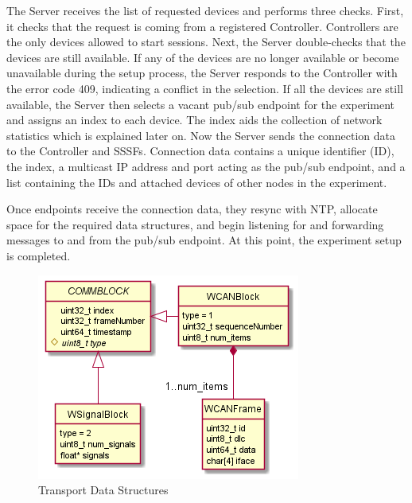 \documentclass[letterpaper,twocolumn,12pt]{article}
\begin{document}
The Server receives the list of requested devices and performs three checks. First, it checks that the request is coming from a registered Controller. Controllers are the only devices allowed to start sessions. Next, the Server double-checks that the devices are still available. If any of the devices are no longer available or become unavailable during the setup process, the Server responds to the Controller with the error code 409, indicating a conflict in the selection. If all the devices are still available, the Server then selects a vacant pub/sub endpoint for the experiment and assigns an index to each device. The index aids the collection of network statistics which is explained later on. Now the Server sends the connection data to the Controller and SSSFs. Connection data contains a unique identifier (ID), the index, 
a multicast IP address and port acting as the pub/sub endpoint, and a list containing the IDs and attached devices of other nodes in the experiment.

Once endpoints receive the connection data, they resync with NTP, allocate space for the required data structures, and begin listening for and forwarding messages to and from the pub/sub endpoint. At this point, the experiment setup is completed.

\begin{figure}[]
    \centering
    \includegraphics[width=\linewidth]{out/images/data_structures/data_structures.png}
    \caption{Transport Data Structures}
    \label{fig:ds}
\end{figure}
\end{document}
